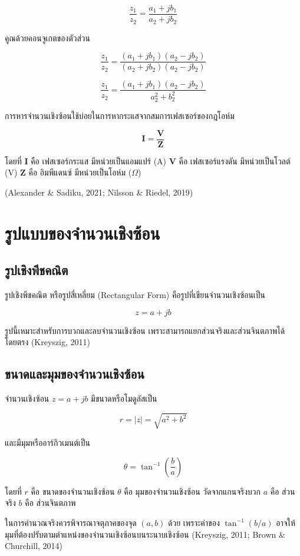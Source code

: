\[
\frac{z_1}{z_2}=\frac{a_1+jb_1}{a_2+jb_2}
\]

คูณด้วยคอนจูเกตของตัวส่วน

\[
\frac{z_1}{z_2}=\frac{(a_1+jb_1)(a_2-jb_2)}{(a_2+jb_2)(a_2-jb_2)}
\]

\[
\frac{z_1}{z_2}=\frac{(a_1+jb_1)(a_2-jb_2)}{a_2^2+b_2^2}
\]

การหารจำนวนเชิงซ้อนใช้บ่อยในการหากระแสจากสมการเฟสเซอร์ของกฎโอห์ม

\[
\mathbf{I}=\frac{\mathbf{V}}{\mathbf{Z}}
\]

โดยที่  
$\mathbf{I}$ คือ เฟสเซอร์กระแส มีหน่วยเป็นแอมแปร์ (A)  
$\mathbf{V}$ คือ เฟสเซอร์แรงดัน มีหน่วยเป็นโวลต์ (V)  
$\mathbf{Z}$ คือ อิมพีแดนซ์ มีหน่วยเป็นโอห์ม ($\Omega$)

(Alexander \& Sadiku, 2021; Nilsson \& Riedel, 2019)

\section{รูปแบบของจำนวนเชิงซ้อน}

\subsection{รูปเชิงพีชคณิต}

รูปเชิงพีชคณิต หรือรูปสี่เหลี่ยม (Rectangular Form) คือรูปที่เขียนจำนวนเชิงซ้อนเป็น

\[
z=a+jb
\]

รูปนี้เหมาะสำหรับการบวกและลบจำนวนเชิงซ้อน เพราะสามารถแยกส่วนจริงและส่วนจินตภาพได้โดยตรง (Kreyszig, 2011)

\subsection{ขนาดและมุมของจำนวนเชิงซ้อน}

จำนวนเชิงซ้อน $z=a+jb$ มีขนาดหรือโมดูลัสเป็น

\[
r=|z|=\sqrt{a^2+b^2}
\]

และมีมุมหรืออาร์กิวเมนต์เป็น

\[
\theta=\tan^{-1}\left(\frac{b}{a}\right)
\]

โดยที่  
$r$ คือ ขนาดของจำนวนเชิงซ้อน  
$\theta$ คือ มุมของจำนวนเชิงซ้อน วัดจากแกนจริงบวก  
$a$ คือ ส่วนจริง  
$b$ คือ ส่วนจินตภาพ

ในการคำนวณจริงควรพิจารณาจตุภาคของจุด $(a,b)$ ด้วย เพราะค่าของ $\tan^{-1}(b/a)$ อาจให้มุมที่ต้องปรับตามตำแหน่งของจำนวนเชิงซ้อนบนระนาบเชิงซ้อน (Kreyszig, 2011; Brown \& Churchill, 2014)

